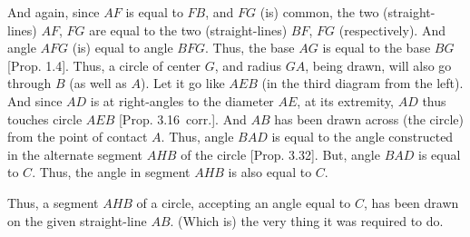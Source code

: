 \begin{Parallel}{}{}
{And again, since $AF$ is equal to $FB$, and $FG$ (is) common, the two (straight-lines) $AF$, $FG$ are equal to the two (straight-lines) $BF$, $FG$ (respectively).
And angle $AFG$ (is) equal to angle $BFG$. Thus, the base $AG$ is equal to
the base $BG$ [Prop. 1.4]. Thus, a circle of center $G$, and radius $GA$,
being drawn, will also go through $B$ (as well as $A$). Let it go like $AEB$ (in the third diagram
from the left). And since $AD$ is at right-angles to the diameter $AE$, at its extremity, $AD$ thus touches circle $AEB$ [Prop. 3.16~corr.]. And $AB$ has been drawn across (the circle) from the point of contact $A$. Thus, angle $BAD$ is equal to the angle constructed in the alternate segment $AHB$ of the circle 
[Prop. 3.32]. But, angle $BAD$ is equal to $C$. Thus, the angle in segment
$AHB$ is also equal to $C$.

Thus, a segment $AHB$ of a circle, accepting an angle equal to $C$, has been
drawn on the given straight-line $AB$. (Which is) the very thing
it was required to do.}
\end{Parallel}

